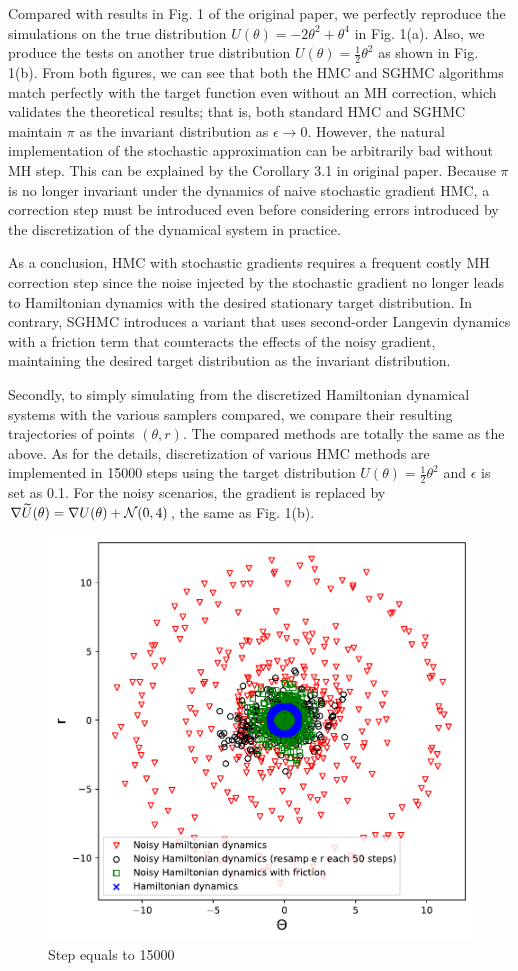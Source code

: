 Compared with results in Fig. 1 of the original paper, we perfectly reproduce the simulations on the true distribution $U(\theta) = -2\theta^2 + \theta^4$ in Fig. 1(a). Also, we produce the tests on another true distribution $U(\theta) = \frac{1}{2}\theta^2$ as shown in Fig. 1(b). From both figures, we can see that both the HMC and SGHMC algorithms match perfectly with the target function even without an MH correction, which validates the theoretical results; that is, both standard HMC and SGHMC maintain $\pi$ as the invariant distribution as $\epsilon \rightarrow 0$. However, the natural implementation of the stochastic approximation can be arbitrarily bad without MH step. This can be explained by the Corollary 3.1 in original paper. Because $\pi$ is no longer invariant under the dynamics of naive stochastic gradient HMC, a correction step must be introduced even before considering errors introduced by the discretization of the dynamical system in practice.

As a conclusion, HMC with stochastic gradients requires a frequent costly MH correction step since the noise injected by the stochastic gradient no longer leads to Hamiltonian dynamics with the desired stationary target distribution. In contrary, SGHMC introduces a variant that uses second-order Langevin dynamics with a friction term that counteracts the effects of the noisy gradient, maintaining the desired target distribution as the invariant distribution.

Secondly, to simply simulating from the discretized Hamiltonian dynamical systems with the various samplers compared, we compare their resulting trajectories of points $(\theta,r)$.  The compared methods are totally the same as the above. As for the details, discretization of various HMC methods are implemented in 15000 steps using the target distribution $U(\theta) = \frac{1}{2}\theta^2$ and $\epsilon$ is set as 0.1. For the noisy scenarios, the gradient is replaced by $\nabla \widetilde{U}(\theta) = \nabla U(\theta) + \mathcal{N}(0,4)$, the same as Fig. 1(b).

\begin{figure}[h!]
    \centering
    \includegraphics[width=0.6\linewidth]{parts/Images/fig2a.pdf}%
    \caption{Step equals to 15000}
     \label{fig:a}%
\end{figure}

